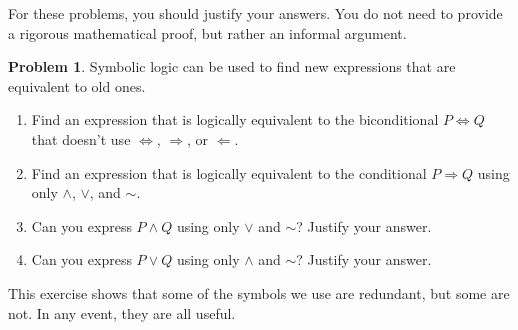 \documentclass[12pt]{amsart}
\newcounter{problem_number}[section]
\theoremstyle{named}
\theoremstyle{definition}
\newtheorem{problem}{Problem}
\begin{document}
For these problems, you should justify your answers. You do not need to provide a rigorous mathematical proof, but rather an informal argument.

\vspace{5mm}

\begin{problem}
	Symbolic logic can be used to find new expressions that are equivalent to old ones.
	\begin{enumerate}
		\item Find an expression that is logically equivalent to the biconditional $P\Leftrightarrow Q$ that doesn't use $\Leftrightarrow$, $\Rightarrow$, or $\Leftarrow$.
		\item Find an expression that is logically equivalent to the conditional $P\Rightarrow Q$ using only $\wedge$, $\vee$, and $\sim$.
		\item Can you express $P\wedge Q$ using only $\vee$ and $\sim$? Justify your answer.
		\item Can you express $P\vee Q$ using only $\wedge$ and $\sim$? Justify your answer.
	\end{enumerate}
	This exercise shows that some of the symbols we use are redundant, but some are not. In any event, they are all useful.
\end{problem}
\end{document}
